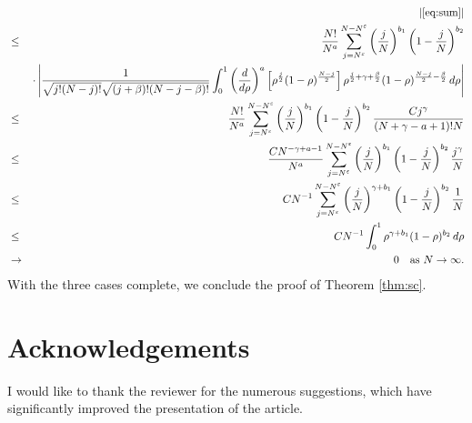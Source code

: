 \documentclass[12pt,reqno]{amsart}
\newcommand\ve{\varepsilon}
\theoremstyle{plain}
\theoremstyle{remark}
\numberwithin{equation}{section}
\begin{document}
\begin{eqnarray*}
&&\left|\eqref{eq:sum}\right|\\
&\le&\frac{N!}{N^a}\sum_{j=N^\ve}^{N-N^\ve}\left(\frac jN\right)^{b_1}\left(1-\frac jN\right)^{b_2}\\
&&\cdot\left|\frac{1}{\sqrt{j!(N-j)!}\sqrt{(j+\beta)!(N-j-\beta)!}}\int_0^1\left(\frac{d}{d\rho}\right)^a\left[\rho^\frac j2(1-\rho)^{\frac{N-j}{2}}\right]\rho^{\frac j2+\gamma+\frac\beta2}(1-\rho)^{\frac{N-j}{2}-\frac\beta2}\,d\rho\right|\\
&\le&\frac{N!}{N^a}\sum_{j=N^\ve}^{N-N^\ve}\left(\frac jN\right)^{b_1}\left(1-\frac jN\right)^{b_2}\frac{Cj^\gamma}{(N+\gamma-a+1)!N}\\
&\le&\frac{CN^{-\gamma+a-1}}{N^a}\sum_{j=N^\ve}^{N-N^\ve}\left(\frac jN\right)^{b_1}\left(1-\frac jN\right)^{b_2}\frac{j^\gamma}{N}\\
&\le&CN^{-1}\sum_{j=N^\ve}^{N-N^\ve}\left(\frac jN\right)^{\gamma+b_1}\left(1-\frac jN\right)^{b_2}\frac{1}{N}\\
&\le&CN^{-1}\int_0^1\rho^{\gamma+b_1}(1-\rho)^{b_2}\,d\rho\\
&\to&0\quad\text{as }N\to\infty.
\end{eqnarray*}
With the three cases complete, we conclude the proof of Theorem \ref{thm:sc}.

\section*{Acknowledgements}
I would like to thank the reviewer for the numerous suggestions, which have significantly improved the presentation of the article.
\end{document}
